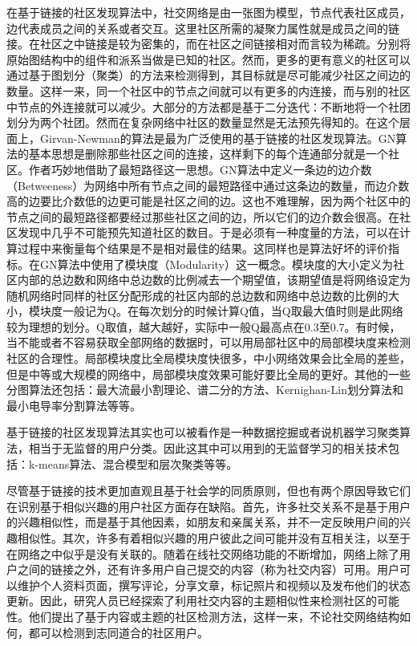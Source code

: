 在基于链接的社区发现算法中，社交网络是由一张图为模型，节点代表社区成员，边代表成员之间的关系或者交互。这里社区所需的凝聚力属性就是成员之间的链接。在社区之中链接是较为密集的，而在社区之间链接相对而言较为稀疏。分别将原始图结构中的组件和派系当做是已知的社区\cite{Fortunato2009Community}。然而，更多的更有意义的社区可以通过基于图划分（聚类）的方法来检测得到，其目标就是尽可能减少社区之间边的数量。这样一来，同一个社区中的节点之间就可以有更多的内连接，而与别的社区中节点的外连接就可以减少。大部分的方法都是基于二分迭代：不断地将一个社团划分为两个社团。然而在复杂网络中社区的数量显然是无法预先得知的。在这个层面上，Girvan-Newman的算法是最为广泛使用的基于链接的社区发现算法\cite{2002Community}。GN算法的基本思想是删除那些社区之间的连接，这样剩下的每个连通部分就是一个社区。作者巧妙地借助了最短路径这一思想。GN算法中定义一条边的边介数（Betweeness）为网络中所有节点之间的最短路径中通过这条边的数量，而边介数高的边要比介数低的边更可能是社区之间的边。这也不难理解，因为两个社区中的节点之间的最短路径都要经过那些社区之间的边，所以它们的边介数会很高。在社区发现中几乎不可能预先知道社区的数目。于是必须有一种度量的方法，可以在计算过程中来衡量每个结果是不是相对最佳的结果。这同样也是算法好坏的评价指标。在GN算法中使用了模块度（Modularity）这一概念。模块度的大小定义为社区内部的总边数和网络中总边数的比例减去一个期望值，该期望值是将网络设定为随机网络时同样的社区分配形成的社区内部的总边数和网络中总边数的比例的大小，模块度一般记为Q。在每次划分的时候计算Q值，当Q取最大值时则是此网络较为理想的划分。Q取值，越大越好，实际中一般Q最高点在0.3至0.7。有时候，当不能或者不容易获取全部网络的数据时，可以用局部社区中的局部模块度来检测社区的合理性。局部模块度比全局模块度快很多，中小网络效果会比全局的差些，但是中等或大规模的网络中，局部模块度效果可能好要比全局的更好。其他的一些分图算法还包括：最大流最小割理论\cite{Jr2009Maximal}、谱二分的方法\cite{Pothen1990Partitioning}、Kernighan-Lin划分算法\cite{Kernigan1970An}和最小电导率分割算法\cite{Leskovec2005Graphs}等等。

基于链接的社区发现算法其实也可以被看作是一种数据挖掘或者说机器学习聚类算法，相当于无监督的用户分类。因此这其中可以用到的无监督学习的相关技术包括：k-means算法、混合模型和层次聚类等等。

尽管基于链接的技术更加直观且基于社会学的同质原则，但也有两个原因导致它们在识别基于相似兴趣的用户社区方面存在缺陷。首先，许多社交关系不是基于用户的兴趣相似性，而是基于其他因素，如朋友和亲属关系，并不一定反映用户间的兴趣相似性。其次，许多有着相似兴趣的用户彼此之间可能并没有互相关注，以至于在网络之中似乎是没有关联的\cite{Deng2013Interaction}。随着在线社交网络功能的不断增加，网络上除了用户之间的链接之外，还有许多用户自己提交的内容（称为社交内容）可用。用户可以维护个人资料页面，撰写评论，分享文章，标记照片和视频以及发布他们的状态更新。因此，研究人员已经探索了利用社交内容的主题相似性来检测社区的可能性。他们提出了基于内容或主题的社区检测方法，这样一来，不论社交网络结构如何，都可以检测到志同道合的社区用户\cite{Natarajan2013Community}。

